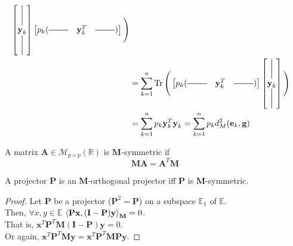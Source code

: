 \begin{notechapter}
\begin{align*}
\begin{bmatrix*}
        \vertbar\\
        {\textbf{y}}_{k} \\
        \vertbar
    \end{bmatrix*}
    \begin{bmatrix*}
        p_k(\horzbar &\textbf{y}_{k}^T& \horzbar)
    \end{bmatrix*}\Bigg)  \\
    &= \sum_{k=1}^{n} \Tr \Bigg(
    \begin{bmatrix*}
        p_k(\horzbar &\textbf{y}_{k}^T& \horzbar)
    \end{bmatrix*}  
    \begin{bmatrix*}
        \vertbar\\
        {\textbf{y}}_{k} \\
        \vertbar
    \end{bmatrix*} \Bigg) \\
    &= \sum_{k=1}^{n} p_k \textbf{y}_k^T \textbf{y}_k = \sum_{k=1}^{n} p_{k} d_{M}^2(\textbf{e}_k,\textbf{g}) 
\end{align*}

\begin{definition}
    A matrix $\textbf{A} \in \mathcal{M}_{p\times p}(\mathbb{R})$ is $\textbf{M}$-symmetric if
    \begin{equation}
        \textbf{M}\textbf{A} = \textbf{A}^T \textbf{M}
    \end{equation}
\end{definition}

\begin{proposition}
A projector $\textbf{P}$ is an $\textbf{M}$-orthogonal projector iff $\textbf{P}$ is $\textbf{M}$-symmetric.
\end{proposition}

\begin{proof} Let $\textbf{P}$ be a projector ($\textbf{P}^2 = \textbf{P}$) on a subspace $\mathbb{E}_1$ of 
$\mathbb{E}$.\\

Then, $\forall{x, y} \in \mathbb{E}$ 
${\langle \textbf{P}\textbf{x}, (\textbf{I} - \textbf{P})\textbf{y} \rangle}_{\textbf{M}} = 0$.\\

That is, $\textbf{x}^T \textbf{P}^T \textbf{M} (\textbf{I} - \textbf{P})\textbf{y} =0$. \\

Or again, $\textbf{x}^T \textbf{P}^T \textbf{M} \textbf{y} = 
\textbf{x}^T \textbf{P}^T \textbf{M} \textbf{P} \textbf{y} $.


\end{proof}
\end{notechapter}
